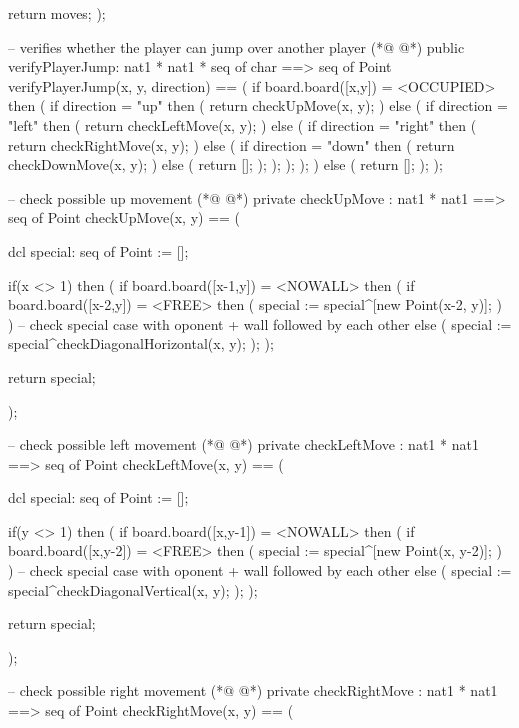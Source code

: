 \begin{vdmpp}[breaklines=true]
   return moves;
  );
  
  -- verifies whether the player can jump over another player
(*@
\label{verifyPlayerJump:212}
@*)
  public verifyPlayerJump: nat1 * nat1 * seq of char ==> seq of Point
  verifyPlayerJump(x, y, direction) ==
  (
   if board.board([x,y]) = <OCCUPIED>
   then
   (
    if direction = "up"
    then
    (
     return checkUpMove(x, y);
    )
    else
    (
     if direction = "left"
     then
     (
      return checkLeftMove(x, y);
     )
     else
     (
      if direction = "right"
      then
      (
       return checkRightMove(x, y);
      )
      else
      (
       if direction = "down"
       then
       (
        return checkDownMove(x, y);
       )
       else
       (
        return [];
       );
      );
     );
    );
   )
   else
   (
    return [];
   );
  );
  
  -- check possible up movement
(*@
\label{checkUpMove:259}
@*)
  private checkUpMove : nat1 * nat1 ==> seq of Point
  checkUpMove(x, y) ==
  (
  
   dcl special: seq of Point := [];
   
   if(x <> 1)
   then
   (
    if board.board([x-1,y]) = <NOWALL>
    then
    (
     if board.board([x-2,y]) = <FREE>
     then
     (
      special := special^[new Point(x-2, y)];
     )
    )
    -- check special case with oponent + wall followed by each other
    else
    (
     special := special^checkDiagonalHorizontal(x, y);
    );
   );
   
   return special;
    
  );
  
  -- check possible left movement
(*@
\label{checkLeftMove:289}
@*)
  private checkLeftMove : nat1 * nat1 ==> seq of Point
  checkLeftMove(x, y) ==
  (
   
   dcl special: seq of Point := [];
   
   if(y <> 1)
   then
   (
    if board.board([x,y-1]) = <NOWALL>
    then
    (
     if board.board([x,y-2]) = <FREE>
     then
     (
      special := special^[new Point(x, y-2)];
     )
    )
    -- check special case with oponent + wall followed by each other
    else
    (
     special := special^checkDiagonalVertical(x, y);
    );
   );
   
   return special;
   
  );
  
  -- check possible right movement
(*@
\label{checkRightMove:319}
@*)
  private checkRightMove : nat1 * nat1 ==> seq of Point
  checkRightMove(x, y) ==
  ( 
  

\end{vdmpp}

